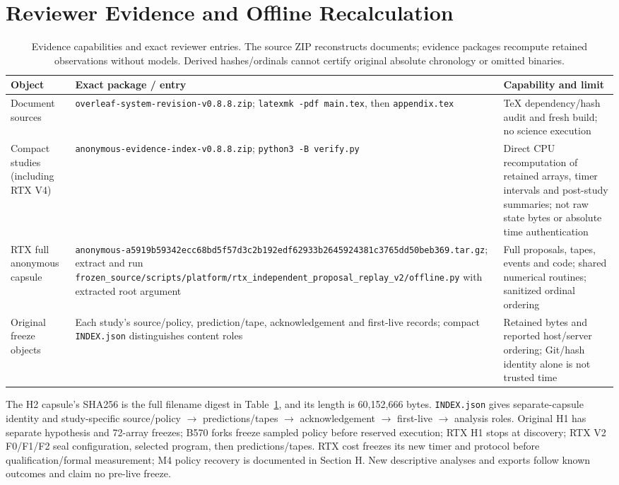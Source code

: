\section{Reviewer Evidence and Offline Recalculation}
\label{app:evidence}
\begin{table}[t]
\caption{Evidence capabilities and exact reviewer entries. The source ZIP reconstructs documents; evidence packages recompute retained observations without models. Derived hashes/ordinals cannot certify original absolute chronology or omitted binaries.}
\label{tab:evidenceentries}
\centering
\begin{tabular}{@{}p{1.55in}p{2.80in}p{1.9in}@{}}
\toprule
Object & Exact package / entry & Capability and limit \\
\midrule
Document sources & \nolinkurl{overleaf-system-revision-v0.8.8.zip}; \texttt{latexmk -pdf main.tex}, then \texttt{appendix.tex} & TeX dependency/hash audit and fresh build; no science execution \\
Compact studies (including RTX V4) & \nolinkurl{anonymous-evidence-index-v0.8.8.zip}; \texttt{python3 -B verify.py} & Direct CPU recomputation of retained arrays, timer intervals and post-study summaries; not raw state bytes or absolute time authentication \\
RTX full anonymous capsule & \nolinkurl{anonymous-a5919b59342ecc68bd5f57d3c2b192edf62933b2645924381c3765dd50beb369.tar.gz}; extract and run \nolinkurl{frozen_source/scripts/platform/rtx_independent_proposal_replay_v2/offline.py} with extracted root argument & Full proposals, tapes, events and code; shared numerical routines; sanitized ordinal ordering \\
Original freeze objects & Each study's source/policy, prediction/tape, acknowledgement and first-live records; compact \texttt{INDEX.json} distinguishes content roles & Retained bytes and reported host/server ordering; Git/hash identity alone is not trusted time \\
\bottomrule
\end{tabular}
\end{table}
The H2 capsule's SHA256 is the full filename digest in Table~\ref{tab:evidenceentries}, and its length is 60,152,666 bytes. \texttt{INDEX.json} gives separate-capsule identity and study-specific source/policy $\to$ predictions/tapes $\to$ acknowledgement $\to$ first-live $\to$ analysis roles. Original H1 has separate hypothesis and 72-array freezes; B570 forks freeze sampled policy before reserved execution; RTX H1 stops at discovery; RTX V2 F0/F1/F2 seal configuration, selected program, then predictions/tapes. RTX cost freezes its new timer and protocol before qualification/formal measurement; M4 policy recovery is documented in Section H. New descriptive analyses and exports follow known outcomes and claim no pre-live freeze.

